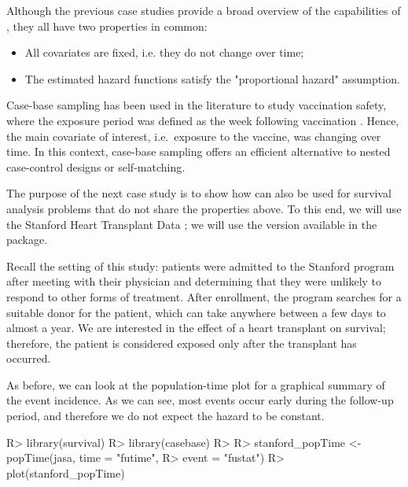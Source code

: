 \documentclass[
]{jss}
\begin{document}
\begin{CodeChunk}
\begin{CodeInput}
Although the previous case studies provide a broad overview of the
capabilities of , they all have two properties in common:

\begin{itemize}
  \item All covariates are fixed, i.e. they do not change over time;
  \item The estimated hazard functions satisfy the "proportional hazard" assumption.
\end{itemize}

Case-base sampling has been used in the literature to study vaccination
safety, where the exposure period was defined as the week following
vaccination \citep{saarela2015case}. Hence, the main covariate of
interest, i.e.~exposure to the vaccine, was changing over time. In this
context, case-base sampling offers an efficient alternative to nested
case-control designs or self-matching.

The purpose of the next case study is to show how  can
also be used for survival analysis problems that do not share the
properties above. To this end, we will use the Stanford Heart Transplant
Data \citep[\citet{crowley1977covariance}]{clark1971cardiac}; we will
use the version available in the  package.

Recall the setting of this study: patients were admitted to the Stanford
program after meeting with their physician and determining that they
were unlikely to respond to other forms of treatment. After enrollment,
the program searches for a suitable donor for the patient, which can
take anywhere between a few days to almost a year. We are interested in
the effect of a heart transplant on survival; therefore, the patient is
considered exposed only after the transplant has occurred.

As before, we can look at the population-time plot for a graphical
summary of the event incidence. As we can see, most events occur early
during the follow-up period, and therefore we do not expect the hazard
to be constant.

\begin{CodeChunk}

\begin{CodeInput}
R> library(survival)
R> library(casebase)
R> 
R> stanford_popTime <- popTime(jasa, time = "futime", 
R>                             event = "fustat")
R> plot(stanford_popTime)
\end{CodeInput}
\end{CodeChunk}


\end{CodeInput}
\end{CodeChunk}
\end{document}
